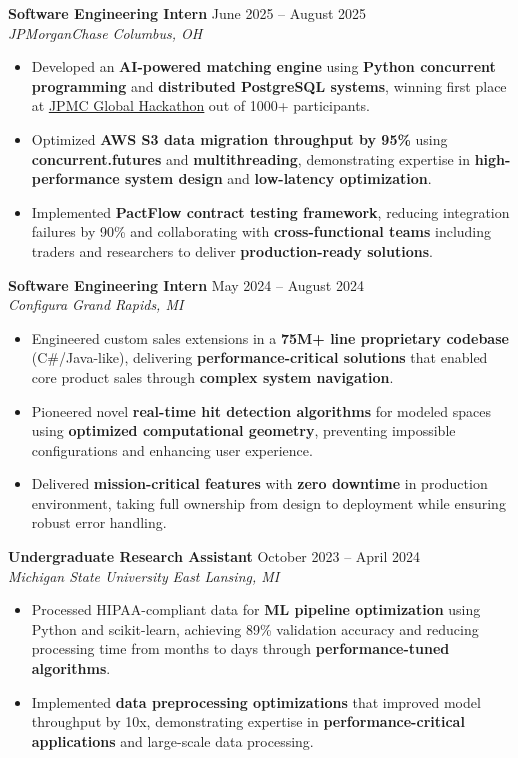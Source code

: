 \documentclass[letterpaper,11pt]{article}
\newcommand{\resumeItem}[1]{
  \item\small{
    {#1 \vspace{-2pt}}
  }
}
\newcommand{\resumeSubheading}[4]{
  \vspace{-2pt}\item
  \textbf{#1} \hfill #2 \\
  \textit{\small#3} \hfill \textit{\small #4} \\
  \vspace{-7pt} %
}
\newcommand{\resumeItemListStart}{\begin{itemize}}
\newcommand{\resumeItemListEnd}{\end{itemize}\vspace{-5pt}}
\begin{document}
    \resumeSubheading
      {Software Engineering Intern}{June 2025 -- August 2025}
      {JPMorganChase}{Columbus, OH}
    \resumeItemListStart
        \resumeItem{Developed an \textbf{AI-powered matching engine} using \textbf{Python concurrent programming} and \textbf{distributed PostgreSQL systems}, winning first place at \underline{\href{https://www.linkedin.com/posts/indi-de-silva_at-jpmorganchase-our-internship-program-activity-7355579081490354177-NYLE}{JPMC Global Hackathon}} out of 1000+ participants.}
        \resumeItem{Optimized \textbf{AWS S3 data migration throughput by 95\%} using \textbf{concurrent.futures} and \textbf{multithreading}, demonstrating expertise in \textbf{high-performance system design} and \textbf{low-latency optimization}.}
        \resumeItem{Implemented \textbf{PactFlow contract testing framework}, reducing integration failures by 90\% and collaborating with \textbf{cross-functional teams} including traders and researchers to deliver \textbf{production-ready solutions}.}
    \resumeItemListEnd

    \resumeSubheading
      {Software Engineering Intern}{May 2024 -- August 2024}
      {Configura}{Grand Rapids, MI}
      \resumeItemListStart
        \resumeItem{Engineered custom sales extensions in a \textbf{75M+ line proprietary codebase} (C\#/Java-like), delivering \textbf{performance-critical solutions} that enabled core product sales through \textbf{complex system navigation}.}
        \resumeItem{Pioneered novel \textbf{real-time hit detection algorithms} for modeled spaces using \textbf{optimized computational geometry}, preventing impossible configurations and enhancing user experience.}
        \resumeItem{Delivered \textbf{mission-critical features} with \textbf{zero downtime} in production environment, taking full ownership from design to deployment while ensuring robust error handling.}
      \resumeItemListEnd

\resumeSubheading
      {Undergraduate Research Assistant}{October 2023 -- April 2024}
      {Michigan State University}{East Lansing, MI}
      \resumeItemListStart
        \resumeItem{Processed HIPAA-compliant data for \textbf{ML pipeline optimization} using Python and scikit-learn, achieving 89\% validation accuracy and reducing processing time from months to days through \textbf{performance-tuned algorithms}.}
        \resumeItem{Implemented \textbf{data preprocessing optimizations} that improved model throughput by 10x, demonstrating expertise in \textbf{performance-critical applications} and large-scale data processing.}
      \resumeItemListEnd
\end{document}
